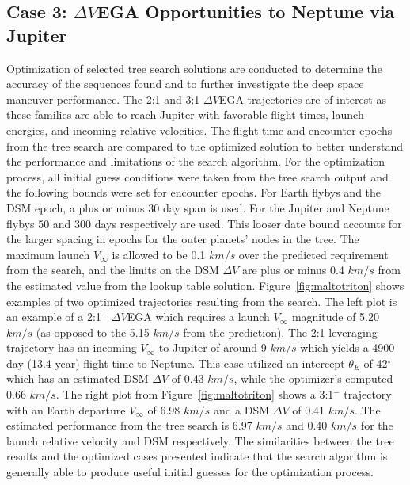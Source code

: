 \documentclass[letterpaper, paper,11pt]{./AAS}		%
\begin{document}
\subsection{Case 3: $\Delta V$EGA Opportunities to Neptune via Jupiter}
Optimization of selected tree search solutions are conducted to determine the accuracy of the sequences found and to further investigate the deep space maneuver performance. The 2:1 and 3:1 $\Delta V$EGA trajectories are of interest as these families are able to reach Jupiter with favorable flight times, launch energies, and incoming relative velocities. The flight time and encounter epochs from the tree search are compared to the optimized solution to better understand the performance and limitations of the search algorithm. For the optimization process, all initial guess conditions were taken from the tree search output and the following bounds were set for encounter epochs. For Earth flybys and the DSM epoch, a plus or minus 30 day span is used. For the Jupiter and Neptune flybys 50 and 300 days respectively are used. This looser date bound accounts for the larger spacing in epochs for the outer planets' nodes in the tree. The maximum launch $V_\infty$ is allowed to be 0.1 $km/s$ over the predicted requirement from the search, and the limits on the DSM $\Delta V$ are plus or minus 0.4 $km/s$ from the estimated value from the lookup table solution. Figure~\ref{fig:maltotriton} shows examples of two optimized trajectories resulting from the search. The left plot is an example of a 2:1$^{+}$ $\Delta V$EGA which requires a launch $V_\infty$ magnitude of 5.20 $km/s$ (as opposed to the 5.15 $km/s$ from the prediction). The 2:1 leveraging trajectory has an incoming $V_\infty$ to Jupiter of around 9 $km/s$ which yields a 4900 day (13.4 year) flight time to Neptune. This case utilized an intercept $\theta_E$ of 42$^\circ$ which has an estimated DSM $\Delta V$ of 0.43 $km/s$, while the optimizer's computed 0.66 $km/s$. The right plot from Figure~\ref{fig:maltotriton} shows a 3:1$^{-}$ trajectory with an Earth departure $V_\infty$ of 6.98 $km/s$ and a DSM $\Delta V$ of 0.41 $km/s$. The estimated performance from the tree search is 6.97 $km/s$ and 0.40 $km/s$ for the launch relative velocity and DSM respectively. The similarities between the tree results and the optimized cases presented indicate that the search algorithm is generally able to produce useful initial guesses for the optimization process.
\end{document}

